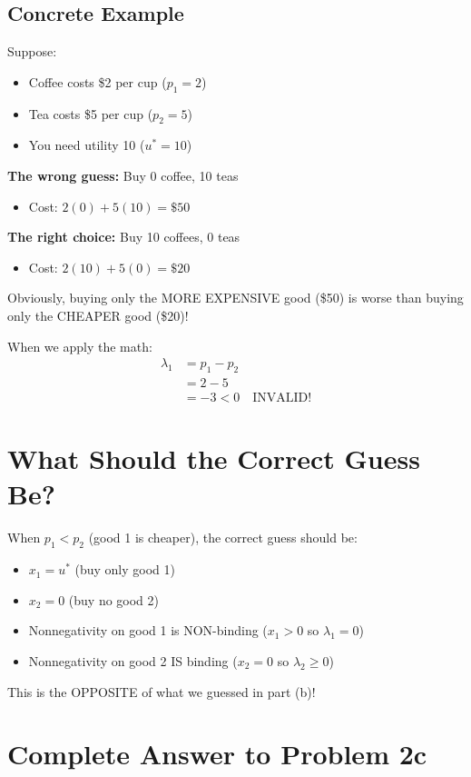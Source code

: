 \documentclass[11pt]{article}
\begin{document}
\subsection{Concrete Example}

Suppose:
\begin{itemize}
\item Coffee costs \$2 per cup ($p_1 = 2$)
\item Tea costs \$5 per cup ($p_2 = 5$)
\item You need utility 10 ($u^* = 10$)
\end{itemize}

\textbf{The wrong guess:} Buy 0 coffee, 10 teas
\begin{itemize}
\item Cost: $2(0) + 5(10) = \$50$
\end{itemize}

\textbf{The right choice:} Buy 10 coffees, 0 teas
\begin{itemize}
\item Cost: $2(10) + 5(0) = \$20$
\end{itemize}

Obviously, buying only the MORE EXPENSIVE good (\$50) is worse than buying only the CHEAPER good (\$20)!

When we apply the math:
\begin{align}
\lambda_1 &= p_1 - p_2 \\
&= 2 - 5 \\
&= -3 < 0 \quad \text{INVALID!}
\end{align}

\section{What Should the Correct Guess Be?}

When $p_1 < p_2$ (good 1 is cheaper), the correct guess should be:
\begin{itemize}
\item $x_1 = u^*$ (buy only good 1)
\item $x_2 = 0$ (buy no good 2)
\item Nonnegativity on good 1 is NON-binding ($x_1 > 0$ so $\lambda_1 = 0$)
\item Nonnegativity on good 2 IS binding ($x_2 = 0$ so $\lambda_2 \geq 0$)
\end{itemize}

This is the OPPOSITE of what we guessed in part (b)!

\section{Complete Answer to Problem 2c}
\end{document}
